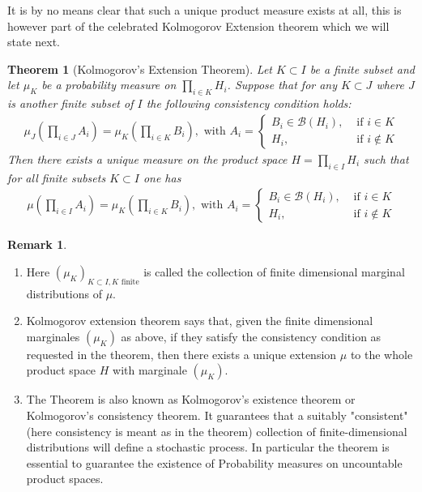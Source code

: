 \documentclass[11pt,a4paper, final]{article}
\newtheorem{thm}{Theorem}[section]
\theoremstyle{definition}
\newtheorem{rem}{Remark}[section]
\begin{document}
\noindent
It is by no means clear that such a unique product measure exists at all, this is however part of the celebrated Kolmogorov Extension theorem which we will state next.
\newpage
\begin{thm}[Kolmogorov's Extension Theorem] Let $K \subset I$ be a finite subset and let $\mu_K$ be a probability measure on $\prod_{i \in K} H_i$. Suppose that for any $K \subset J$ where $J$ is another finite subset of $I$ the following consistency condition holds:
\begin{align*}
\mu_J \left( \prod_{i \in J} A_i\right) = \mu_K \left( \prod_{i \in K} B_i \right), \text{ with } A_i = \begin{cases} B_i \in \mathcal{B}(H_i), & \text{ if } i \in K \\
H_i, & \text{ if } i \notin K  \end{cases}
\end{align*}
Then there exists a unique measure on the product space $H= \prod_{i \in I} H_i$ such that for all finite subsets $K \subset I$ one has 
\begin{align*}
\mu \left( \prod_{i \in I} A_i \right) = \mu_K \left( \prod_{i \in K } B_i \right), \text{ with } A_i = \begin{cases} B_i \in \mathcal{B}(H_i), & \text{ if } i \in K \\
H_i, & \text{ if } i \notin K \end{cases}
\end{align*}
\end{thm}
\begin{rem} \ \begin{enumerate} \item Here $( \mu_K)_{K \subset I, K \text{ finite} }$ is called the collection of finite dimensional marginal distributions of $\mu$.
\item Kolmogorov extension theorem says that, given the finite dimensional marginales $( \mu_K)$ as above, if they satisfy the consistency condition as requested in the theorem, then there exists a unique extension $\mu$ to the whole product space $H$ with marginale $(\mu_K)$. 
\item The Theorem is also known as Kolmogorov's existence theorem or Kolmogorov's consistency theorem. It guarantees that a suitably "consistent" (here consistency is meant as in the theorem) collection of finite-dimensional distributions will define a stochastic process. In particular the theorem is essential to guarantee the existence of Probability measures on uncountable product spaces. 
\end{enumerate}
\end{rem}
\end{document}
